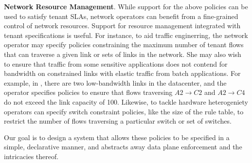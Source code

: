 \begin{compactitemize}
\item \textbf{Network Resource Management}. While support for the above
policies can be used to satisfy tenant SLAs, network operators can
benefit from a fine-grained control of network resources. Support for
resource management integrated with tenant specifications is useful.
For instance, to aid traffic enginerring, the network
operator may specify policies constraining the maximum number of
tenant flows that can traverse a given link or sets of links in the
network. She may also wish to ensure that traffic from some sensitive
applications does not contend for bandwidth on constrained links with
elastic traffic from batch applications. For example, in ,
there are two low-bandwidth links in the datacenter, and the operator
specifies policies to ensure that flows traversing $A2 \rightarrow C2$ 
and $A2 \rightarrow C4$ do not exceed the link capacity of 100.
  Likewise, to tackle hardware heterogeniety operators can specify
  switch constraint policies, like the size of the rule table, to
  restrict the number of flows traversing a particular switch or set
  of switches.
\end{compactitemize}

  \noindent Our goal is to design a system that allows these policies to be
  specified in a simple, declarative manner, and abstracts away 
  data plane enforcement and the intricacies thereof.
  
